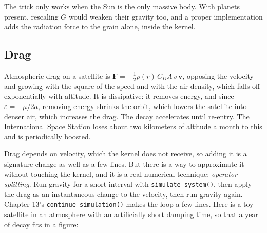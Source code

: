 \documentclass[
  10.5pt,
  letterpaper,
]{scrbook}
\theoremstyle{plain}
\theoremstyle{remark}
\begin{document}
The trick only works when the Sun is the only massive body. With planets
present, rescaling \(G\) would weaken their gravity too, and a proper
implementation adds the radiation force to the grain alone, inside the
kernel.

\subsection{Drag}\label{drag}

Atmospheric drag on a satellite is
\(\mathbf{F} = -\tfrac12 \rho(r)\, C_D A\, v\,\mathbf{v}\), opposing the
velocity and growing with the square of the speed and with the air
density, which falls off exponentially with altitude. It is dissipative:
it removes energy, and since \(\varepsilon = -\mu/2a\), removing energy
shrinks the orbit, which lowers the satellite into denser air, which
increases the drag. The decay accelerates until re-entry. The
International Space Station loses about two kilometers of altitude a
month to this and is periodically boosted.

Drag depends on velocity, which the kernel does not receive, so adding
it is a signature change as well as a few lines. But there is a way to
approximate it without touching the kernel, and it is a real numerical
technique: \emph{operator splitting}. Run gravity for a short interval
with \texttt{simulate\_system()}, then apply the drag as an
instantaneous change to the velocity, then run gravity again. Chapter
13's \texttt{continue\_simulation()} makes the loop a few lines. Here is
a toy satellite in an atmosphere with an artificially short damping
time, so that a year of decay fits in a figure:
\end{document}
